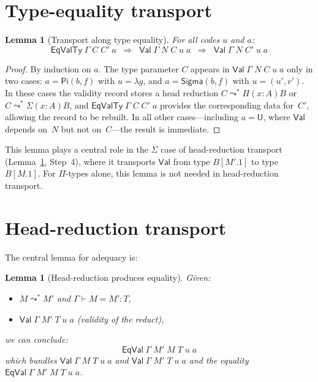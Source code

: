 \documentclass[11pt]{article}
\newcommand{\conveq}[4]{#1 \vdash #2 = #3 : #4}
\newcommand{\Pitype}[2]{\Pi(#1)#2}
\newcommand{\substone}[2]{#1[#2]}
\newcommand{\U}{\mathsf{U}}
\newcommand{\PiC}[2]{\mathsf{Pi}(#1,#2)}
\newcommand{\SigmaC}[2]{\mathsf{Sigma}(#1,#2)}
\newcommand{\Red}{\mathrel{\leadsto^*}}
\newcommand{\Sigmatype}[2]{\Sigma(#1)#2}
\newcommand{\Val}{\mathsf{Val}}
\newcommand{\EqVal}{\mathsf{EqVal}}
\newcommand{\EqValTy}{\mathsf{EqValTy}}
\newcommand{\pj}[2]{#1\mbox{.}#2}
\newtheorem{lemma}[theorem]{Lemma}
\begin{document}
\section{Type-equality transport}

\begin{lemma}[Transport along type equality]\label{lem:transport}
For all codes $u$ and $a$:
\[
  \EqValTy\;\Gamma\;C\;C'\;a \;\;\Longrightarrow\;\;
  \Val\;\Gamma\;N\;C\;u\;a \;\;\Longrightarrow\;\;
  \Val\;\Gamma\;N\;C'\;u\;a
\]
\end{lemma}

\begin{proof}
By induction on $a$.  The type parameter $C$ appears in $\Val\;\Gamma\;N\;C\;u\;a$
only in two cases: $a = \PiC{b}{f}$ with $u = \lambda g$, and
$a = \SigmaC{b}{f}$ with $u = (u',v')$.  In these cases the validity
record stores a head reduction $C \Red \Pitype{x{:}A}{B}$
or $C \Red \Sigmatype{x{:}A}{B}$, and $\EqValTy\;\Gamma\;C\;C'\;a$
provides the corresponding data for~$C'$, allowing
the record to be rebuilt.  In all other cases---including $a = \U$,
where $\Val$ depends on~$N$ but not on~$C$---the result is immediate.
\end{proof}

\begin{remark}
This lemma plays a central role in the $\Sigma$ case of
head-reduction transport (Lemma~\ref{lem:headred}, Step~4), where it
transports $\Val$ from type $\substone{B}{\pj{M'}{1}}$ to type
$\substone{B}{\pj{M}{1}}$.
For $\Pi$-types alone, this lemma is not needed in head-reduction transport.
\end{remark}

\section{Head-reduction transport}

The central lemma for adequacy is:

\begin{lemma}[Head-reduction produces equality]\label{lem:headred}
Given:
\begin{itemize}
\item $M \Red M'$ and $\conveq{\Gamma}{M}{M'}{T}$,
\item $\Val\;\Gamma\;M'\;T\;u\;a$ \quad (validity of the reduct),
\end{itemize}
we can conclude:
\[
  \EqVal\;\Gamma\;M'\;M\;T\;u\;a
\]
which bundles $\Val\;\Gamma\;M\;T\;u\;a$ and $\Val\;\Gamma\;M'\;T\;u\;a$
and the equality $\EqVal\;\Gamma\;M'\;M\;T\;u\;a$.
\end{lemma}
\end{document}
